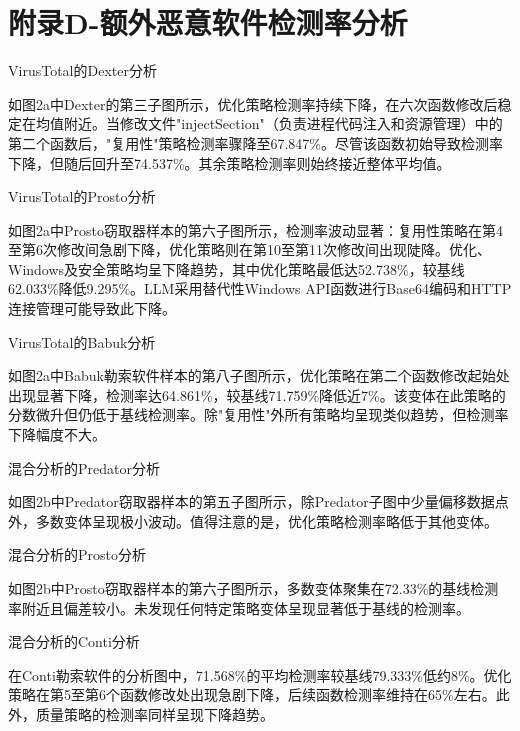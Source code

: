 \chapter{附录D-额外恶意软件检测率分析}
VirusTotal的Dexter分析

如图2a中Dexter的第三子图所示，优化策略检测率持续下降，在六次函数修改后稳定在均值附近。当修改文件"injectSection"（负责进程代码注入和资源管理）中的第二个函数后，"复用性"策略检测率骤降至67.847\%。尽管该函数初始导致检测率下降，但随后回升至74.537\%。其余策略检测率则始终接近整体平均值。

VirusTotal的Prosto分析

如图2a中Prosto窃取器样本的第六子图所示，检测率波动显著：复用性策略在第4至第6次修改间急剧下降，优化策略则在第10至第11次修改间出现陡降。优化、Windows及安全策略均呈下降趋势，其中优化策略最低达52.738\%，较基线62.033\%降低9.295\%。LLM采用替代性Windows API函数进行Base64编码和HTTP连接管理可能导致此下降。

VirusTotal的Babuk分析

如图2a中Babuk勒索软件样本的第八子图所示，优化策略在第二个函数修改起始处出现显著下降，检测率达64.861\%，较基线71.759\%降低近7\%。该变体在此策略的分数微升但仍低于基线检测率。除"复用性"外所有策略均呈现类似趋势，但检测率下降幅度不大。

混合分析的Predator分析

如图2b中Predator窃取器样本的第五子图所示，除Predator子图中少量偏移数据点外，多数变体呈现极小波动。值得注意的是，优化策略检测率略低于其他变体。

混合分析的Prosto分析

如图2b中Prosto窃取器样本的第六子图所示，多数变体聚集在72.33\%的基线检测率附近且偏差较小。未发现任何特定策略变体呈现显著低于基线的检测率。

混合分析的Conti分析

在Conti勒索软件的分析图中，71.568\%的平均检测率较基线79.333\%低约8\%。优化策略在第5至第6个函数修改处出现急剧下降，后续函数检测率维持在65\%左右。此外，质量策略的检测率同样呈现下降趋势。
